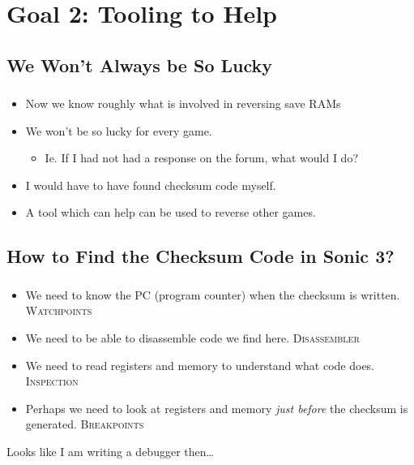 \documentclass{beamer}
\begin{document}

\section{Goal 2: Tooling to Help}

\subsection{We Won't Always be So Lucky}

\begin{frame}[fragile]
\frametitle{\insertsubsection}


\vfill
\begin{itemize}
\item Now we know roughly what is involved in reversing save RAMs
\vfill
\item We won't be so lucky for every game.
\begin{itemize}
\item Ie. If I had not had a response on the forum, what would I do?
\end{itemize}
\vfill
\item I would have to have found checksum code myself.
\vfill
\item A tool which can help can be used to reverse other games.
\end{itemize}

\vfill

\end{frame}


\subsection{How to Find the Checksum Code in Sonic 3?}

\begin{frame}[fragile]
\frametitle{\insertsubsection}

\begin{itemize}
\item We need to know the PC (program counter) when the checksum is written. \textsc{Watchpoints}
\vfill
\item We need to be able to disassemble code we find here. \textsc{Disassembler}
\vfill
\item We need to read registers and memory to understand what code does. \textsc{Inspection}
\vfill
\item Perhaps we need to look at registers and memory \emph{just before} the checksum is generated. \textsc{Breakpoints}
\end{itemize}

\pause

\begin{center}
Looks like I am writing a debugger then\ldots
\end{center}

\end{frame}
\end{document}
